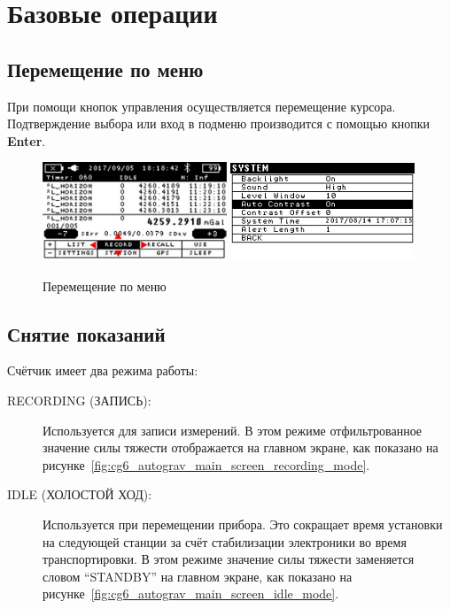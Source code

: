 \section{Базовые операции}

\subsection{Перемещение по меню}

При помощи кнопок управления осуществляется перемещение курсора.  Подтверждение
выбора или вход в подменю производится с помощью кнопки \textbf{Enter}.

\begin{figure}[h]
  \centering
  \includegraphics[width=0.49\textwidth]{figures/navigation_the_menus_1}
  \includegraphics[width=0.49\textwidth]{figures/navigation_the_menus_2}
  \caption{Перемещение по меню}
  \label{fig:navigation_the_menus}
\end{figure}

\subsection{Снятие показаний}

Счётчик имеет два режима работы:
\begin{description}
  \item[RECORDING (ЗАПИСЬ):] Используется для записи измерений. В этом режиме
    отфильтрованное значение силы тяжести отображается на главном экране, как
    показано на рисунке~\ref{fig:cg6_autograv_main_screen_recording_mode}.

  \item[IDLE (ХОЛОСТОЙ ХОД):] Используется при перемещении прибора. Это
    сокращает время установки на следующей станции за счёт стабилизации
    электроники во время транспортировки. В этом режиме значение силы тяжести
    заменяется словом “STANDBY” на главном экране, как показано на
    рисунке~\ref{fig:cg6_autograv_main_screen_idle_mode}. 
\end{description}

